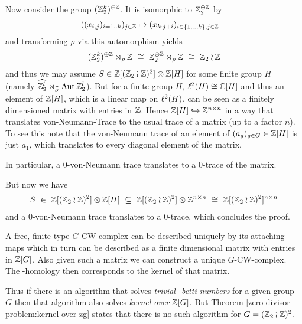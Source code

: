 	Now consider the group $(\mathbb{Z}_2^k)^{\oplus\mathbb{Z}}$. It is isomorphic to $\mathbb{Z}_2^{\oplus \mathbb{Z}}$ by
	\begin{align*}
		& ((x_{i,j})_{i = 1 .. k})_{j \in \mathbb{Z}} \mapsto (x_{k \cdot j + i})_{i \in \{1,..,k\}, j \in \mathbb{Z}}
	\end{align*}
	and transforming $\rho$ via this automorphism yields
	\begin{align*}
		(\mathbb{Z}_2^k)^{\oplus\mathbb{Z}} \rtimes_\rho \mathbb{Z} ~\cong~ \mathbb{Z}_2^{\oplus\mathbb{Z}} \rtimes_{\rho} \mathbb{Z} ~\cong~ \mathbb{Z}_2 \wr \mathbb{Z}
	\end{align*}
	and thus we may assume $S \in \mathbb{Z}[(\mathbb{Z}_2 \wr \mathbb{Z})^2] \otimes \mathbb{Z}[H]$ for some finite group $H$ (namely $\widehat{\mathbb{Z}_2^l} \rtimes_{\widehat\sigma} \operatorname{Aut} \mathbb{Z}_2^l$).
	But for a finite group $H$, $\ell^2(H) \cong \mathbb{C}[H]$ and thus an element of $\mathbb{Z}[H]$, which is a linear map on $\ell^2(H)$, can be seen as a finitely dimensioned matrix with entries in $\mathbb{Z}$.
	Hence $\mathbb{Z}[H] \hookrightarrow \mathbb{Z}^{n \times n}$ in a way that translates von-Neumann-Trace to the usual trace of a matrix (up to a factor $n$).
	To see this note that the von-Neumann trace of an element of $(a_g)_{g \in G} \in \mathbb{Z}[H]$ is just $a_1$, which translates to every diagonal element of the matrix.

	In particular, a $0$-von-Neumann trace translates to a $0$-trace of the matrix.

	But now we have
	\begin{align*}
		S ~\in~ \mathbb{Z}[(\mathbb{Z}_2 \wr \mathbb{Z})^2] \otimes \mathbb{Z}[H] ~\subseteq~ \mathbb{Z}[(\mathbb{Z}_2 \wr \mathbb{Z})^2] \otimes \mathbb{Z}^{n \times n} ~\cong~ \mathbb{Z}[(\mathbb{Z}_2 \wr \mathbb{Z})^2]^{n \times n}
	\end{align*}
	and a $0$-von-Neumann trace translates to a $0$-trace, which concludes the proof.
\endproof

	A free, finite type $G$-CW-complex can be described uniquely by its attaching maps which in turn can be described as a finite dimensional matrix with entries in $\mathbb{Z}[G]$. Also given such a matrix we can construct a unique $G$-CW-complex. The \ltwo-homology then corresponds to the kernel of that matrix.\footnotemark

	Thus if there is an algorithm that solves \emph{trivial \ltwo-betti-numbers} for a given group $G$ then that algorithm also solves \emph{kernel-over-$\mathbb{Z}[G]$}. But Theorem \ref{zero-divisor-problem:kernel-over-zg} states that there is no such algorithm for $G = (\mathbb{Z}_2 \wr \mathbb{Z})^2$.
\endproof

